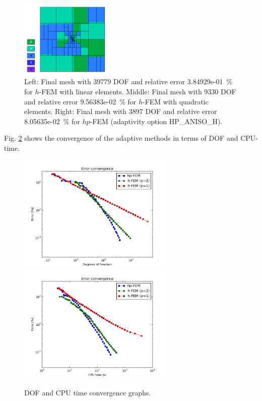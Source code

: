 \documentclass[12pt]{elsarticle}
\begin{document}
\begin{figure}[!ht]
\includegraphics[height=3.7cm]{nist/nist-3/mesh_v_hp_anisoh.png}
\caption{
Left: Final mesh with 39779 DOF and relative error 3.84929e-01~\% for $h$-FEM with linear elements.
Middle: Final mesh with 9330 DOF and relative error 9.56383e-02~\% for $h$-FEM with quadratic elements.
Right: Final mesh with 3897 DOF and relative error 8.05635e-02~\% for $hp$-FEM (adaptivity option HP\_ANISO\_H).}
\label{fig:nist-3-hp-aniso}
\end{figure}

Fig. \ref{fig:nist-3-conv} shows the convergence of the adaptive methods in terms of DOF and CPU-time.

\begin{figure}[H]
\centering
\hspace{-50mm}
\includegraphics[width=7.5cm]{nist/nist-3/conv_dof_aniso.png}\ \
\hspace{-10mm}
\includegraphics[width=7.5cm]{nist/nist-3/conv_cpu_aniso.png}
\hspace{-50mm}
\caption{DOF and CPU time convergence graphs.}
\label{fig:nist-3-conv}
\end{figure}
\end{document}
